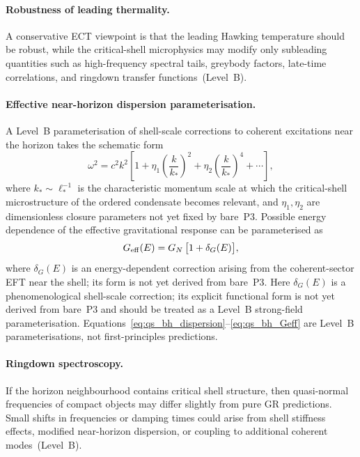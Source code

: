 \documentclass[11pt,a4paper]{article}
\numberwithin{equation}{section}
\begin{document}
\paragraph{Robustness of leading thermality.}
A conservative ECT viewpoint is that the leading Hawking temperature
should be robust, while the critical-shell microphysics may modify only
subleading quantities such as high-frequency spectral tails, greybody
factors, late-time correlations, and ringdown transfer functions~(Level~B).

\paragraph{Effective near-horizon dispersion parameterisation.}
A Level~B parameterisation of shell-scale corrections to coherent
excitations near the horizon takes the schematic form
\begin{equation}
  \label{eq:qs_bh_dispersion}
  \omega^2
  = c^2 k^2
  \left[
    1+\eta_1\left(\frac{k}{k_*}\right)^2
    +\eta_2\left(\frac{k}{k_*}\right)^4
    + \cdots
  \right],
\end{equation}
where $k_*\sim\ell_*^{-1}$ is the characteristic momentum scale at
which the critical-shell microstructure of the ordered condensate
becomes relevant, and $\eta_1,\eta_2$ are dimensionless closure
parameters not yet fixed by bare~P3.
Possible energy dependence of the effective gravitational response can
be parameterised as
\begin{equation}
  \label{eq:qs_bh_Geff}
  G_{\rm eff}(E)
  = G_N\,\bigl[1+\delta_G(E)\bigr],
\end{equation}
where $\delta_G(E)$ is an energy-dependent correction arising from the
coherent-sector EFT near the shell; its form is not yet derived from
bare~P3.
Here $\delta_G(E)$ is a phenomenological shell-scale correction;
its explicit functional form is not yet derived from bare~P3 and
should be treated as a Level~B strong-field parameterisation.
Equations~\eqref{eq:qs_bh_dispersion}--\eqref{eq:qs_bh_Geff} are
Level~B parameterisations, not first-principles predictions.

\paragraph{Ringdown spectroscopy.}
If the horizon neighbourhood contains critical shell structure, then
quasi-normal frequencies of compact objects may differ slightly from
pure GR predictions.
Small shifts in frequencies or damping times could arise from shell
stiffness effects, modified near-horizon dispersion, or coupling to
additional coherent modes~(Level~B).
\end{document}
